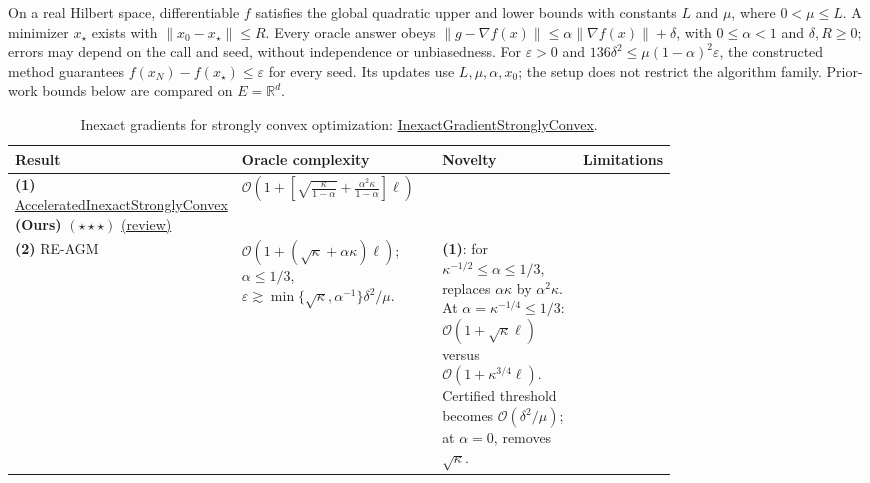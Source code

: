 \begin{table}[tp]
\centering
\caption{Inexact gradients for strongly convex optimization: \href{https://github.com/k3nfalt/longtails/blob/main/LongTails/Setups/InexactGradientStronglyConvex.lean}{InexactGradientStronglyConvex}.}\label{tab:InexactGradientStronglyConvex}
\parbox{\linewidth}{\footnotesize On a real Hilbert space, differentiable $f$ satisfies the global quadratic upper and lower bounds with constants $L$ and $\mu$, where $0<\mu\le L$. A minimizer $x_\star$ exists with $\|x_0-x_\star\|\le R$. Every oracle answer obeys $\|g-\nabla f(x)\|\le\alpha\|\nabla f(x)\|+\delta$, with $0\le\alpha<1$ and $\delta,R\ge0$; errors may depend on the call and seed, without independence or unbiasedness. For $\varepsilon>0$ and $136\delta^2\le\mu(1-\alpha)^2\varepsilon$, the constructed method guarantees $f(x_N)-f(x_\star)\le\varepsilon$ for every seed. Its updates use $L,\mu,\alpha,x_0$; the setup does not restrict the algorithm family. Prior-work bounds below are compared on $E=\mathbb R^d$.}\par\smallskip
\begin{threeparttable}
\footnotesize
\setlength{\tabcolsep}{4pt}\renewcommand{\arraystretch}{1.25}
\begin{tabularx}{\linewidth}{@{}>{\raggedright\arraybackslash}p{0.20\linewidth}>{\raggedright\arraybackslash}p{0.32\linewidth}>{\raggedright\arraybackslash}p{0.25\linewidth}>{\raggedright\arraybackslash}X@{}}
\toprule
\textbf{Result} & \textbf{Oracle complexity} & \textbf{Novelty} & \textbf{Limitations} \\
\midrule
\textbf{(1)} \href{https://github.com/k3nfalt/longtails/blob/main/LongTails/Theorems/AcceleratedInexactStronglyConvex.lean}{Accelerated\allowbreak{}Inexact\allowbreak{}Strongly\allowbreak{}Convex} \textbf{(Ours)} $(\star\star\star)$ \href{https://github.com/k3nfalt/longtails/blob/main/scripts/reviews/AcceleratedInexactStronglyConvex.md}{(review)}
& $\mathcal{O}\!\left(1+\left[\sqrt{\frac{\kappa}{1-\alpha}}+\frac{\alpha^2\kappa}{1-\alpha}\right]\ell\right)$ & & \\
\midrule[1.2pt]
\textbf{(2)} RE-AGM \citep[Thm.~6.1]{igscVasinGasnikov2026v1}
& $\mathcal{O}\!\left(1+(\sqrt\kappa+\alpha\kappa)\ell\right)$; $\alpha\le1/3$, $\varepsilon\gtrsim\min\{\sqrt\kappa,\alpha^{-1}\}\delta^2/\mu$.
& \textbf{(1)}: for $\kappa^{-1/2}\le\alpha\le1/3$, replaces $\alpha\kappa$ by $\alpha^2\kappa$. At $\alpha=\kappa^{-1/4}\le1/3$: $\mathcal{O}(1+\sqrt\kappa\ell)$ versus $\mathcal{O}(1+\kappa^{3/4}\ell)$. Certified threshold becomes $\mathcal{O}(\delta^2/\mu)$; at $\alpha=0$, removes $\sqrt\kappa$.

\end{tabularx}
\end{threeparttable}
\end{table}
